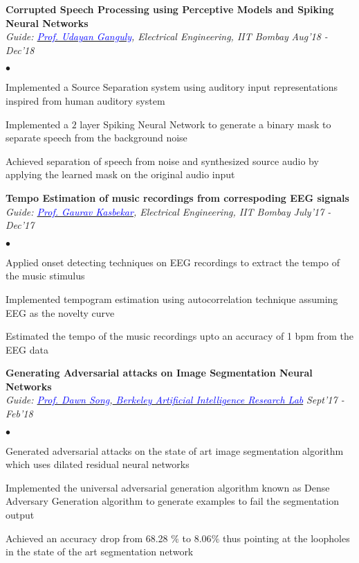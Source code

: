\documentclass[margin,line]{res}
\newenvironment{list2}{
  \begin{list}{$\bullet$}{%
      \setlength{\itemsep}{0.03in}
      \setlength{\parsep}{0in} \setlength{\parskip}{0in}
      \setlength{\topsep}{0in} \setlength{\partopsep}{0in} 
      \setlength{\leftmargin}{0.2in}}}{\end{list}}
\begin{document}
\begin{resume}
{\bf Corrupted Speech Processing using Perceptive Models and Spiking Neural Networks} \\
{\em Guide: \href{https://www.ee.iitb.ac.in/wiki/faculty/udayan}{\textcolor{blue}{Prof. Udayan Ganguly}}, Electrical Engineering, IIT Bombay} \hfill {\it Aug'18 - Dec'18}\\
\vspace*{-.13in}
\begin{list2}
\item Implemented a Source Separation system using auditory input representations inspired from human auditory system
\item Implemented a $2$ layer Spiking Neural Network to generate a binary mask to separate speech from the background noise
\item Achieved separation of speech from noise and synthesized source audio by applying the learned mask on the original audio input 
\end{list2}


{\bf Tempo Estimation of music recordings from correspoding EEG signals} \\
{\em Guide: \href{https://www.ee.iitb.ac.in/~gskasbekar/}{\textcolor{blue}{Prof. Gaurav Kasbekar}}, Electrical Engineering, IIT Bombay} \hfill {\it July'17 - Dec'17}\\
\vspace*{-.13in}
\begin{list2}
\item Applied onset detecting techniques on EEG recordings to extract the tempo of the music stimulus
\item Implemented tempogram estimation using autocorrelation technique assuming EEG as the novelty curve
\item Estimated the tempo of the music recordings upto an accuracy of 1 bpm from the EEG data
\end{list2}



{\bf Generating Adversarial attacks on Image Segmentation Neural Networks} \\
{\em Guide: \href{https://people.eecs.berkeley.edu/~dawnsong/}{\textcolor{blue}{Prof. Dawn Song}},\href{https://bair.berkeley.edu}{\textcolor{blue}{ Berkeley Artificial Intelligence Research Lab}}} \hfill {\it Sept'17 - Feb'18}\\
\vspace*{-.13in}
\begin{list2}
\item Generated adversarial attacks on the state of art image segmentation algorithm which uses dilated residual neural networks
\item Implemented the universal adversarial generation algorithm known as Dense Adversary Generation algorithm to generate examples to fail the segmentation output 
\item Achieved an accuracy drop from 68.28 $\%$ to 8.06$\%$ thus pointing at the loopholes in the state of the art segmentation network
\end{list2}



\end{resume}
\end{document}
